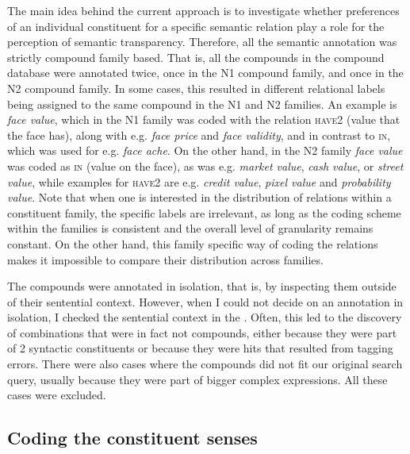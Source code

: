 %
The main idea behind the current approach is to investigate whether
preferences of an individual constituent for a specific semantic
relation 
play a role for the perception of
semantic transparency. Therefore, all the semantic annotation was strictly compound family
based. That is, all the compounds in the compound database were
annotated twice, once in the N1 compound family, and once in the N2
compound family.  In some cases, this resulted in different relational
labels being assigned to the same compound in the N1 and N2
families. An example is \emph{face value}, which in the N1 family was
coded with the relation \textsc{have2} (value that the face has),
along with e.g. \emph{face price} and \emph{face validity}, and in
contrast to \textsc{in}, which was used for e.g. \emph{face
  ache}. %
On the other hand, in the N2 family \emph{face value} was coded as
\textsc{in} (value on the face), as was e.g. \emph{market value},
\emph{cash value}, or \emph{street value}, while examples for
\textsc{have2} are e.g. \emph{credit value}, \emph{pixel value} and
\emph{probability value}. Note that when one is interested in
the distribution of relations within a constituent family, the
specific labels are irrelevant, as long as the coding scheme within
the families is consistent and the overall level of granularity
remains constant. \enlargethispage{\baselineskip}
On the other hand, this family specific way of
coding the relations makes it impossible to compare their distribution across families.

The compounds were annotated in isolation, that is, by inspecting them
outside of their 
sentential context. However, when I could not
decide on an annotation in isolation, I checked the sentential context in
the . Often, this led to the discovery of combinations that were in
fact not compounds, either because they were part of 2 syntactic constituents or
because they were hits that resulted from tagging errors. There were also cases where the
compounds did not fit our
original search query, usually because they were part of bigger
complex expressions. All these cases were excluded.


\subsection{Coding the constituent senses}
\label{sec:coding-the-senses}

